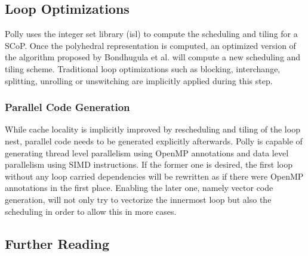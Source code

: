 \subsection{Loop Optimizations}
Polly uses the integer set library (isl) to compute the scheduling and
tiling for a SCoP. Once the polyhedral representation is computed,
an optimized version of the  algorithm proposed by Bondhugula et 
al.\cite{Bondhugula:2008:PAP:1379022.1375595}
will compute a new scheduling and tiling scheme. 
Traditional loop optimizations such as blocking, interchange, splitting,
unrolling or unswitching are implicitly applied during this step. 



\subsubsection{Parallel Code Generation}
While cache locality is implicitly improved by rescheduling and tiling 
of the loop nest,  parallel code needs to be generated explicitly afterwards.
Polly is capable of generating
thread level parallelism using OpenMP annotations and data level parallelism 
using SIMD instructions. 
If the former one is desired, the first loop without any loop carried 
dependencies will be rewritten as if there were OpenMP annotations in the first
place. Enabling the later one, namely vector code generation, 
will not only try to vectorize the innermost loop but also the 
scheduling in order to  allow this in more cases.



\subsection*{Further Reading}

